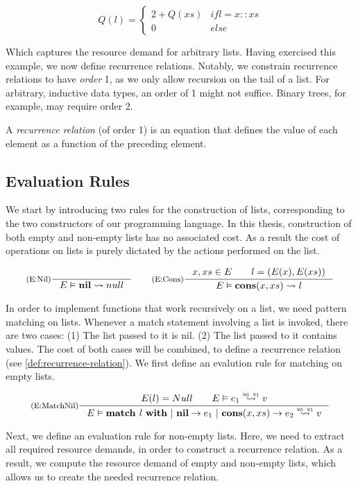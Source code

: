 \[
   Q(l) = \begin{cases*}
      2 + Q(xs)            & if l = x :: xs\\
      0                    & else
   \end{cases*}
\]

Which captures the resource demand for arbitrary lists. Having exercised this example, we now define recurrence relations. Notably, we constrain recurrence relations to have \emph{order} 1, as we only allow recursion on the tail of a list. For arbitrary, inductive data types, an order of 1 might not suffice. Binary trees, for example, may require order 2.

\begin{definition}\label{def:recurrence-relation}
   A \emph{recurrence relation} (of order 1) is an equation that defines the value of each element as a function of the preceding element.
\end{definition}

\subsection{Evaluation Rules}

We start by introducing two rules for the construction of lists, corresponding to the two constructors of our programming language. In this thesis, construction of both empty and non-empty lists has no associated cost. As a result the cost of operations on lists is purely dictated by the actions performed on the list. 

\[
   \inference[(E:Nil)]
   {}
   {\evals{E}{\listnil}{null}{}{}}
   \qquad
   \inference[(E:Cons)]
   {\contains{E}{x, xs} \qquad l = (E(x), E(xs))}
   {\evals{E}{\cons{x}{xs}}{l}{}{}}
\]

In order to implement functions that work recursively on a list, we need pattern matching on lists. Whenever a match statement involving a list is invoked, there are two cases: (1) The list passed to it is nil. (2) The list passed to it contains values. The cost of both cases will be combined, to define a recurrence relation (see \cref{def:recurrence-relation}). We first define an evalution rule for matching on empty lists.

\[
   \inference[(E:MatchNil)]
   {E(l) = Null \qquad \evals{E}{e_1}{v}{q_0}{q_1}}
   {\evals{E}{\listmatch{l}{e_1}{e_2}}{v}{q_0}{q_1}}
\]

Next, we define an evaluation rule for non-empty lists. Here, we need to extract all required resource demands, in order to construct a recurrence relation. As a result, we compute the resource demand of empty and non-empty lists, which allows us to create the needed recurrence relation.

